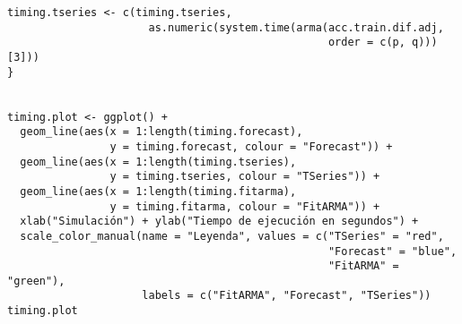 \documentclass[12pt,a4paper,oneside]{article}
\begin{document}
\begin{Verbatim}[fontsize=\footnotesize]
  timing.tseries <- c(timing.tseries,
                      as.numeric(system.time(arma(acc.train.dif.adj,
                                                  order = c(p, q)))[3]))
}


timing.plot <- ggplot() +
  geom_line(aes(x = 1:length(timing.forecast),
                y = timing.forecast, colour = "Forecast")) +
  geom_line(aes(x = 1:length(timing.tseries),
                y = timing.tseries, colour = "TSeries")) +
  geom_line(aes(x = 1:length(timing.fitarma),
                y = timing.fitarma, colour = "FitARMA")) +
  xlab("Simulación") + ylab("Tiempo de ejecución en segundos") +
  scale_color_manual(name = "Leyenda", values = c("TSeries" = "red",
                                                  "Forecast" = "blue",
                                                  "FitARMA" = "green"),
                     labels = c("FitARMA", "Forecast", "TSeries"))
timing.plot
\end{Verbatim} 
\end{document}
